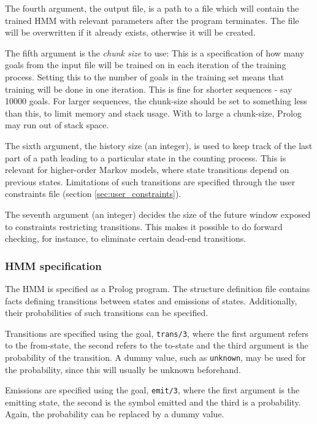 \documentclass{article}
\begin{document}
The fourth argument, the output file, is a path to a file which will contain the trained HMM with relevant parameters after the program terminates.
The file will be overwritten if it already exists, otherwise it will be created. 

The fifth argument is the \emph{chunk size} to use: This is a specification of how many goals from the input file will be trained on in each iteration of the training process.
Setting this to the number of goals in the training set means that training will be done in one iteration. This is fine for shorter sequences - say 10000 goals. For larger sequences,
the chunk-size should be set to something less than this, to limit memory and stack usage. With to large a chunk-size, Prolog may run out of stack space.

The sixth argument, the history size (an integer), is used to keep track of the last part of a path leading to a particular state in the counting process. This is relevant for 
higher-order Markov models, where state transitions depend on previous states. Limitations of such transitions are specified through the user constraints file (section \ref{sec:user_constraints}).

The seventh argument (an integer) decides the size of the future window exposed to constraints restricting transitions. This makes it possible to do forward checking, for instance, to eliminate certain 
dead-end transitions.

\subsubsection{HMM specification}
\label{sec:hmmspec}

The HMM is specified as a Prolog program. The structure definition file contains facts defining transitions between states and emissions of states.
Additionally, their probabilities of such transitions can be specified.

Transitions are specified using the goal, \texttt{trans/3}, where the first argument refers to the from-state, the second refers to the to-state and the third argument
is the probability of the transition. A dummy value, such as \texttt{unknown},  may be used for the probability, since this will usually be unknown beforehand. 

Emissions are specified using the goal, \texttt{emit/3}, where the first argument is the emitting state, the second is the symbol emitted and the third is a probability. 
Again, the probability can be replaced by a dummy value.
\end{document}
